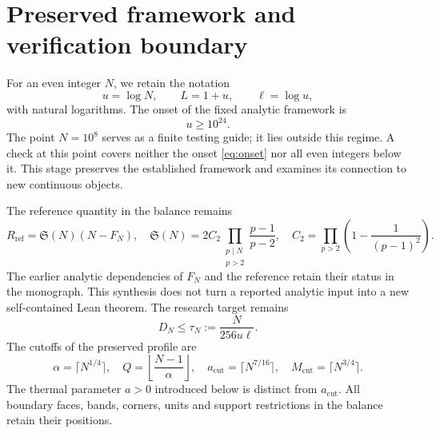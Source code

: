 \documentclass[11pt,a4paper]{article}
\theoremstyle{remark}
\newcommand{\Sing}{\mathfrak S}
\begin{document}
\clearpage
\section{Preserved framework and verification boundary}\label{sec:frame}
For an even integer $N$, we retain the notation
\[
u=\log N,\qquad L=1+u,\qquad \ell=\log u,
\]
with natural logarithms. The onset of the fixed analytic framework is
\begin{equation}\label{eq:onset}
u\ge 10^{24}.
\end{equation}
The point $N=10^8$ serves as a finite testing guide; it lies outside this regime.
A check at this point covers neither the onset \eqref{eq:onset} nor all even
integers below it. This stage preserves the established framework and examines
its connection to new continuous objects.

The reference quantity in the balance remains
\begin{equation}\label{eq:reference}
R_{\mathrm{ref}}=\Sing(N)(N-F_N),\quad
\Sing(N)=2C_2\prod_{\substack{p\mid N\\p>2}}\frac{p-1}{p-2},\quad
C_2=\prod_{p>2}\left(1-\frac1{(p-1)^2}\right).
\end{equation}
The earlier analytic dependencies of $F_N$ and the reference retain their
status in the monograph. This synthesis does not turn a reported analytic
input into a new self-contained Lean theorem. The research target remains
\begin{equation}\label{eq:target}
D_N\le \tau_N:=\frac{N}{256u\ell}.
\end{equation}
The cutoffs of the preserved profile are
\[
\alpha=\lceil N^{1/4}\rceil,\quad Q=\left\lfloor\frac{N-1}{\alpha}\right\rfloor,
\quad a_{\mathrm{cut}}=\lceil N^{7/16}\rceil,
\quad M_{\mathrm{cut}}=\lceil N^{3/4}\rceil.
\]
The thermal parameter $a>0$ introduced below is distinct from
$a_{\mathrm{cut}}$. All boundary faces, bands, corners, units and support
restrictions in the balance retain their positions.
\end{document}
